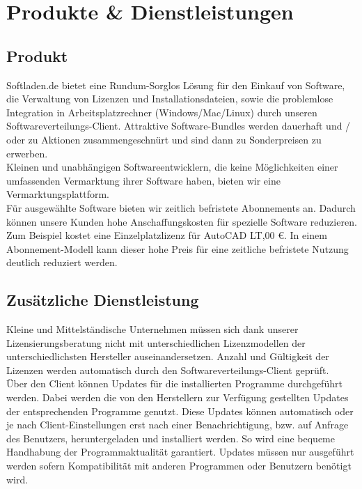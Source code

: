 \chapter{Produkte \& Dienstleistungen}
\section{Produkt}
Softladen.de bietet eine Rundum-Sorglos Lösung für den Einkauf von Software, die Verwaltung von Lizenzen und Installationsdateien, sowie die problemlose Integration in Arbeitsplatzrechner (Windows/Mac/Linux) durch unseren Softwareverteilungs-Client. Attraktive Software-Bundles werden dauerhaft und / oder zu Aktionen zusammengeschnürt und sind dann zu Sonderpreisen zu erwerben.\\

Kleinen und unabhängigen Softwareentwicklern, die keine Möglichkeiten einer umfassenden Vermarktung ihrer Software haben, bieten wir eine Vermarktungsplattform.\\ 

Für ausgewählte Software bieten wir zeitlich befristete Abonnements an. Dadurch können unsere Kunden hohe Anschaffungskosten für spezielle Software reduzieren. Zum Beispiel kostet eine Einzelplatzlizenz für AutoCAD LT,00 €. In einem Abonnement-Modell kann dieser hohe Preis für eine zeitliche befristete Nutzung deutlich reduziert werden.  \\ 

\section{Zusätzliche Dienstleistung}
Kleine und Mittelständische Unternehmen müssen sich dank unserer Lizensierungsberatung nicht mit unterschiedlichen Lizenzmodellen der unterschiedlichsten Hersteller auseinandersetzen. Anzahl und Gültigkeit der Lizenzen werden automatisch durch den Softwareverteilungs-Client geprüft.\\

Über den Client können Updates für die installierten Programme durchgeführt werden. Dabei werden die von den Herstellern zur Verfügung gestellten Updates der entsprechenden Programme genutzt. Diese Updates können automatisch oder je nach Client-Einstellungen erst nach einer Benachrichtigung, bzw. auf Anfrage des Benutzers, heruntergeladen und installiert werden. So wird eine bequeme Handhabung der Programmaktualität garantiert. Updates müssen nur ausgeführt werden sofern Kompatibilität mit anderen Programmen oder Benutzern benötigt wird. \\

